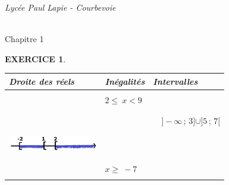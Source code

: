 \documentclass[a4paper]{article}   %
\renewcommand{\(}{\left(}
\renewcommand{\)}{\right)}
\newtheorem{EXO}{\large EXERCICE }
\newenvironment{EX}   { \setcounter{ques}{0} \begin{EXO} \hrulefill ~\vspace{0.3cm}

\normalfont}    {\end{EXO} \medskip}
\newcommand{\ie}{\leqslant ~}  		%
\newcommand{\se}{\geqslant~} 		%
\def\cl{{\Large \bf{2nde}}}
\begin{document}


\noindent\begin{minipage}{.20\linewidth}\begin{center}                   
\noindent \emph{Lycée Paul Lapie - Courbevoie}
\end{center}\end{minipage}
\begin{minipage}{1.5\linewidth}\begin{center}		
\noindent \cl\\ Chapitre 1
\end{center}\end{minipage}

\begin{center} 	
\end{center}

\begin{EX}
\begin{center}
\begin{tabular}{|p{4cm}| p{4cm}| p{4cm}|}		
\hline							
Droite des réels & Inégalités & Intervalles \\
\hline
&& \\
& \qquad $2 \ie x < 9$ &\\
&& \\
\hline
&& \\
& & $\quad ]-\infty\,;\,3]\cup]5\,;\,7[$\\
&& \\
\hline
&& \\
\includegraphics[width=3.9cm]{1ex1.png}&&\\
&&\\
\hline
&& \\
& \qquad $x \se -7 $ &\\
&& \\
\hline
\end{tabular}
\end{center}
\end{EX}
\end{document}
